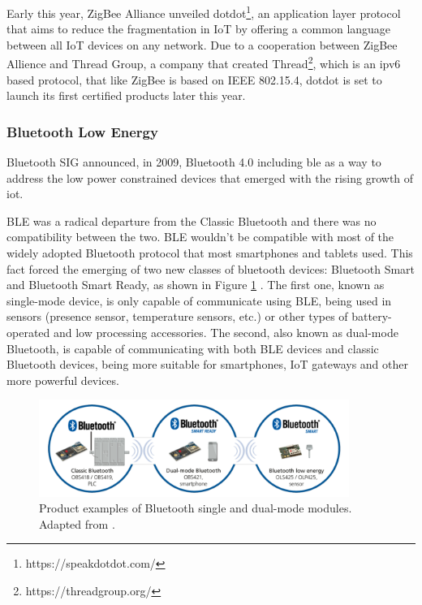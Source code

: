 Early this year, ZigBee Alliance unveiled dotdot\footnote{https://speakdotdot.com/}, an application layer protocol that aims to reduce the fragmentation in IoT by offering a common language between all IoT devices on any network. Due to a cooperation between ZigBee Allience and Thread Group, a company that created Thread\footnote{https://threadgroup.org/}, which is an \ac{ipv6} based protocol, that like ZigBee is based on IEEE 802.15.4, dotdot is set to launch its first certified products later this year.


\subsubsection{Bluetooth Low Energy}

Bluetooth SIG announced, in 2009, Bluetooth 4.0 including \acf{ble} as a way to address the low power constrained devices that emerged with the rising growth of \ac{iot}. 

BLE was a radical departure from the Classic Bluetooth and there was no compatibility between the two. BLE wouldn't be compatible with most of the widely adopted Bluetooth protocol that most smartphones and tablets used. This fact forced the emerging of two new classes of bluetooth devices: Bluetooth Smart and Bluetooth Smart Ready, as shown in Figure \ref{fig:ble1} \cite{Andersson2014}. The first one, known as single-mode device, is only capable of communicate using BLE, being used in sensors (presence sensor, temperature sensors, etc.) or other types of battery-operated and low processing accessories. The second, also known as dual-mode Bluetooth, is capable of communicating with both BLE devices and classic Bluetooth devices, being more suitable for smartphones, IoT gateways and other more powerful devices. 

\begin{figure}[H]
	\centering
	\includegraphics[width=0.9\textwidth]{figures/ble.png}
	\caption{Product examples of Bluetooth single and dual-mode modules. Adapted from \cite{Andersson2014}.}
	\label{fig:ble1}
\end{figure}

